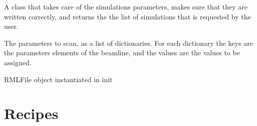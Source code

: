 \documentclass[letterpaper,10pt,english]{sphinxmanual}
\begin{document}
\begin{fulllineitems}
\label{\detokenize{code_documentation:raypyng.simulate.SimulationParams}}
\pysigstartsignatures
{}
\pysigstopsignatures
\sphinxAtStartPar
A class that takes care of the simulations parameters, makes sure that they are written correctly,
and returns the the list of simulations that is requested by the user.

\begin{fulllineitems}
\label{\detokenize{code_documentation:raypyng.simulate.SimulationParams.params}}
\pysigstartsignatures
{}
\pysigstopsignatures
\sphinxAtStartPar
The parameters to scan, as a list of dictionaries.
For each dictionary the keys are the parameters elements of the beamline, and the values are the
values to be assigned.

\end{fulllineitems}


\begin{fulllineitems}
\label{\detokenize{code_documentation:raypyng.simulate.SimulationParams.rml}}
\pysigstartsignatures
{}
\pysigstopsignatures
\sphinxAtStartPar
RMLFile object instantiated in init

\end{fulllineitems}


\end{fulllineitems}



\section{Recipes}
\label{\detokenize{code_documentation:recipes}}
\end{document}
